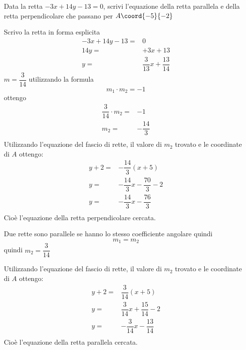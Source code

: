 	Data la retta $-3x+14y-13=0$, scrivi l'equazione della retta parallela e della retta perpendicolare che passano per  $A\coord{-5}{-2}$

	Scrivo la retta in forma esplicita
	\begin{align*}
		-3x+14y-13=&0\\
		14y=&+3x+13\\
		y=&\dfrac{3}{13}x+\dfrac{13}{14}
	\end{align*}
	 	$m=\dfrac{3}{14}$ utilizzando la formula \[m_1\cdot m_2=-1\] ottengo
	 	\begin{align*}
	 		\dfrac{3}{14}\cdot m_2=&-1\\
	 		m_2=&-\dfrac{14}{3}\\
	 	\end{align*}
	 		Utilizzando l'equazione del fascio di rette, il valore di $m_2$ trovato e le coordinate di $A$ ottengo:
	 		\begin{align*}
	 			y+2=&-\dfrac{14}{3}(x+5)\\
	 			y=&-\dfrac{14}{3}x-\dfrac{70}{3}-2\\
	 			y=&-\dfrac{14}{3}x-\dfrac{76}{3}\\
	 		\end{align*}
	 		Cioè l'equazione della retta perpendicolare cercata.

	 		Due rette sono parallele se hanno lo stesso coefficiente angolare quindi \[m_1=m_2 \]
	 		quindi $m_2=\dfrac{3}{14}$

	 		Utilizzando l'equazione del fascio di rette, il valore di $m_2$ trovato e le coordinate di $A$ ottengo:
	 		\begin{align*}
	 			y+2=&\dfrac{3}{14}(x+5)\\
	 			y=&\dfrac{3}{14}x+\dfrac{15}{14}-2\\
	 			y=&-\dfrac{3}{14}x-\dfrac{13}{14}\\
	 		\end{align*}
	 		Cioè l'equazione della retta parallela cercata.

	 			\begin{center}
	 				
	 			\end{center}
